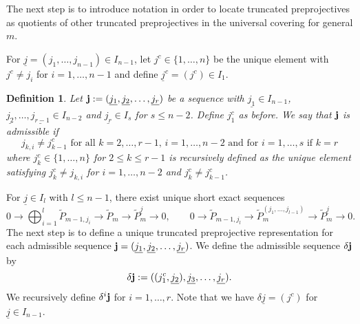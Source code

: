 \documentclass{amsart}
\newtheorem{definition}[theorem]{Definition}
\newcommand{\uj}{\underline j}
\newcommand{\ses}[3]{0\rightarrow #1\rightarrow #2\rightarrow#3\rightarrow 0}
\begin{document}
The next step is to introduce notation in order to locate truncated preprojectives as quotients of other truncated preprojectives in the universal covering for general $m$.

For $\uj=(j_1,\ldots,j_{n-1})\in I_{n-1}$, let $j^c\in \{1,\ldots,n\}$ be the unique element with $j^c\neq j_i$ for $i=1,\ldots,n-1$ and define $\uj^c=(j^c)\in I_1$.



\begin{definition}Let ${\bf j}:=(\underline{j_1},\underline{j_2},\ldots,\underline{j_r})$ be a sequence with $\underline{j_1}\in I_{n-1}$, $\underline{j_2},\ldots,\underline{j_{r-1}}\in I_{n-2}$ and $\underline{j_r}\in I_s$ for $s\leq n-2$. Define $j_1^c$ as before.
 We say that ${\bf j}$ is admissible if 
$$ j_{k,i}\neq j_{k-1}^{c}\text{ for all }k=2,\ldots, r-1,\,i=1,\ldots,n-2\text{ and for }i=1,\ldots,s\text{ if }k=r$$
where $j_{k}^c\in\{1,\ldots,n\}$ for $2\leq k\leq r-1$ is recursively defined as the unique element satisfying $j_k^c\neq j_{k,i}$ for $i=1,\ldots,n-2$ and $j_k^c\neq j_{k-1}^c$. 
\end{definition}


For $\uj\in I_{l}$ with $l\leq n-1$, there exist unique short exact sequences 
\[\ses{\bigoplus_{i=1}^l\tilde P_{m-1,j_i}}{\tilde P_m}{\tilde P_{m}^{\uj}},\quad\quad\ses{\tilde P_{m-1,j_l}}{\tilde P_{m}^{(j_1,\ldots,j_{l-1})}}{\tilde P_{m}^{\uj}}.\]
The next step is to define a unique truncated preprojective representation for each admissible sequence ${\bf j}=(\underline{j_1},\underline{j_2},\ldots,\underline{j_r})$. We define the admissible sequence $\delta {\bf j}$ by
\[\delta {\bf j}:=((j_1^c,\underline{j_2}),\underline{j_3},\ldots,\underline{j_r}).\]
We recursively define $\delta^i{\bf j}$ for $i=1,\dots,r$.
Note that we have $\delta\uj=(j^c)$ for $\uj\in I_{n-1}$.
\end{document}
